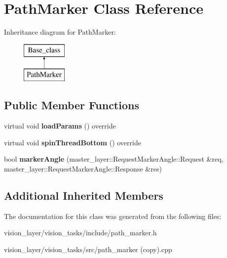 \hypertarget{classPathMarker}{}\section{Path\+Marker Class Reference}
\label{classPathMarker}
Inheritance diagram for Path\+Marker\+:\begin{figure}[H]
\begin{center}
\leavevmode
\includegraphics[height=2.000000cm]{classPathMarker}
\end{center}
\end{figure}
\subsection*{Public Member Functions}
\begin{DoxyCompactItemize}
\item 
\mbox{\label{classPathMarker_ab86f122f0f0c5481c2601590330e7159}} 
virtual void {\bfseries load\+Params} () override
\item 
\mbox{\label{classPathMarker_ae1ba30c7fc34f815d047eb47a390be13}} 
virtual void {\bfseries spin\+Thread\+Bottom} () override
\item 
\mbox{\label{classPathMarker_a338b0c9ef7f117cc4e7ca0316da2d9f2}} 
bool {\bfseries marker\+Angle} (master\+\_\+layer\+::\+Request\+Marker\+Angle\+::\+Request \&req, master\+\_\+layer\+::\+Request\+Marker\+Angle\+::\+Response \&res)
\end{DoxyCompactItemize}
\subsection*{Additional Inherited Members}


The documentation for this class was generated from the following files\+:\begin{DoxyCompactItemize}
\item 
vision\+\_\+layer/vision\+\_\+tasks/include/path\+\_\+marker.\+h\item 
vision\+\_\+layer/vision\+\_\+tasks/src/path\+\_\+marker (copy).\+cpp\end{DoxyCompactItemize}
